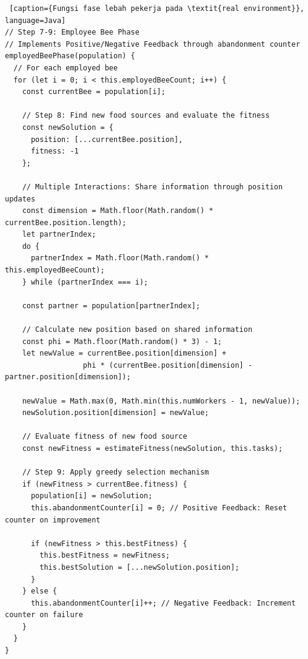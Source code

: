 \begin{lstlisting} [caption={Fungsi fase lebah pekerja pada \textit{real environment}}, language=Java]
// Step 7-9: Employee Bee Phase
// Implements Positive/Negative Feedback through abandonment counter
employedBeePhase(population) {
  // For each employed bee
  for (let i = 0; i < this.employedBeeCount; i++) {
    const currentBee = population[i];
    
    // Step 8: Find new food sources and evaluate the fitness
    const newSolution = {
      position: [...currentBee.position],
      fitness: -1
    };
    
    // Multiple Interactions: Share information through position updates
    const dimension = Math.floor(Math.random() * currentBee.position.length);
    let partnerIndex;
    do {
      partnerIndex = Math.floor(Math.random() * this.employedBeeCount);
    } while (partnerIndex === i);
    
    const partner = population[partnerIndex];
    
    // Calculate new position based on shared information
    const phi = Math.floor(Math.random() * 3) - 1;
    let newValue = currentBee.position[dimension] + 
                  phi * (currentBee.position[dimension] - partner.position[dimension]);
    
    newValue = Math.max(0, Math.min(this.numWorkers - 1, newValue));
    newSolution.position[dimension] = newValue;

    // Evaluate fitness of new food source
    const newFitness = estimateFitness(newSolution, this.tasks);

    // Step 9: Apply greedy selection mechanism
    if (newFitness > currentBee.fitness) {
      population[i] = newSolution;
      this.abandonmentCounter[i] = 0; // Positive Feedback: Reset counter on improvement
      
      if (newFitness > this.bestFitness) {
        this.bestFitness = newFitness;
        this.bestSolution = [...newSolution.position];
      }
    } else {
      this.abandonmentCounter[i]++; // Negative Feedback: Increment counter on failure
    }
  }
}
\end{lstlisting}

